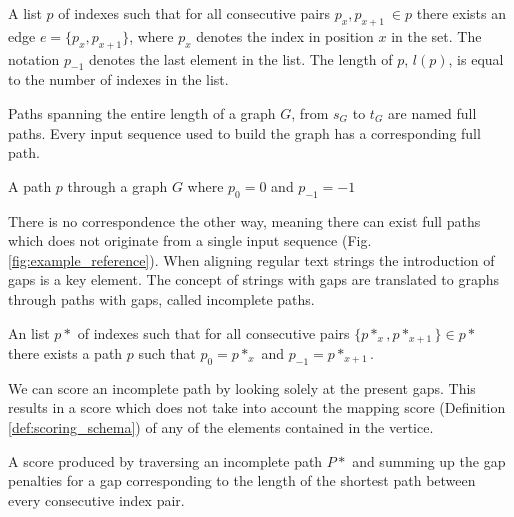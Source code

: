 \documentclass[thesis.tex]{subfiles}
\begin{document}
{\begin{defn}
  A list $p$ of indexes such that for all consecutive pairs $p_x, p_{x+1}\ \in p$ there exists an edge $e=\{p_x, p_{x+1}\}$, where $p_x$ denotes the index in position $x$ in the set. The notation $p_{-1}$ denotes the last element in the list. The length of $p$, $l(p)$, is equal to the number of indexes in the list.
\end{defn}
Paths spanning the entire length of a graph $G$, from $s_G$ to $t_G$ are named full paths. Every input sequence used to build the graph has a corresponding full path.
\begin{defn}
  A path $p$ through a graph $G$ where $p_0=0$ and $p_{-1}=-1$
\end{defn}
There is no correspondence the other way, meaning there can exist full paths which does not originate from a single input sequence (Fig. \ref{fig:example_reference}). When aligning regular text strings the introduction of gaps is a key element. The concept of strings with gaps are translated to graphs through paths with gaps, called incomplete paths.
\begin{defn}
  An list $p*$ of indexes such that for all consecutive pairs $\{p*_x, p*_{x+1}\} \in p*$ there exists a path $p$ such that $p_0=p*_x$ and $p_{-1}=p*_{x+1}$.
\end{defn}
We can score an incomplete path by looking solely at the present gaps. This results in a score which does not take into account the mapping score (Definition \ref{def:scoring_schema}) of any of the elements contained in the vertice.
\begin{defn}
  A score produced by traversing an incomplete path $P*$ and summing up the gap penalties for a gap corresponding to the length of the shortest path between every consecutive index pair.
\end{defn}
\begin{figure}
  \begin{mdframed}
    \begin{center}
\end{center}
\end{mdframed}
\end{figure}}
\end{document}
